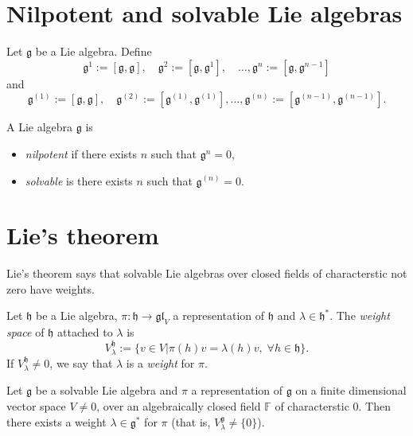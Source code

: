 \section{Nilpotent and solvable Lie algebras}
\label{section-nilpotent-and-solvable-Lie-algebras}

Let $\mathfrak{g}$ be a Lie algebra. Define
$$
\mathfrak{g}^1:=[\mathfrak{g},\mathfrak{g}],\quad 
\mathfrak{g}^2:=[\mathfrak{g},\mathfrak{g}^1],\quad 
\ldots,
\mathfrak{g}^n:=[\mathfrak{g},\mathfrak{g}^{n-1}]
$$
and
$$
\mathfrak{g}^{(1)}:=[\mathfrak{g},\mathfrak{g}],\quad 
\mathfrak{g}^{(2)}:=[\mathfrak{g}^{(1)},\mathfrak{g}^{(1)}],
\ldots,
\mathfrak{g}^{(n)}:=[\mathfrak{g}^{(n-1)},\mathfrak{g}^{(n-1)}].
$$

\begin{definition}
\label{definition-nilpotent-and-solvable-Lie-algebras}
A Lie algebra $\mathfrak{g}$ is
\begin{itemize}
\item {\it nilpotent} if there exists $n$ such that $\mathfrak{g}^n=0$,
\item {\it solvable} is there exists $n$ such that $\mathfrak{g}^{(n)}=0$.
\end{itemize}
\end{definition}

\section{Lie's theorem}
\label{section-Lie-theorem}

Lie's theorem says that solvable Lie algebras over closed fields of
characterstic not zero have weights.

\begin{definition}
\label{definition-weight-space}
Let $\mathfrak{h}$ be a Lie algebra, 
$\pi:\mathfrak{h}\to\mathfrak{gl}_V$ a representation of $\mathfrak{h}$ 
and $\lambda \in \mathfrak{h}^*$. The {\it weight space} of $\mathfrak{h}$
attached to $\lambda$ is
$$
V_\lambda^{\mathfrak{h}}:=\{v \in V|\pi(h)v=\lambda(h)v,\; 
\forall h \in \mathfrak{h}\}.
$$
If $V_\lambda^{\mathfrak{h}}\neq 0$, we say that $\lambda$ is a {\it weight} for
$\pi$.
\end{definition}

\begin{theorem}
\label{theorem-Lie}
Let $\mathfrak{g}$ be a solvable Lie algebra and $\pi$ a representation of
$\mathfrak{g}$ on a finite dimensional vector space $V \neq 0$, over an
algebraically closed field $\mathbb{F}$ of characterstic 0. 
Then there exists a weight $\lambda \in \mathfrak{g}^*$ for $\pi$ 
(that is, $V_\lambda^\mathfrak{g} \neq \{0\}$).
\end{theorem}

